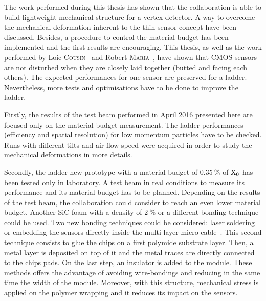 
The work performed during this thesis has shown that the collaboration is able to build lightweight mechanical structure for a vertex detector.
A way to overcome the mechanical deformation inherent to the thin-sensor concept have been discussed.
Besides, a procedure to control the material budget has been implemented and the first results are encouraging.
This thesis, as well as the work performed by Loic \textsc{Cousin}~\cite{cousin} and Robert \textsc{Maria}~\cite{maria}, have shown that \gls{CMOS} sensors are not disturbed when they are closely laid together (butted and facing each others).
The expected performances for one sensor are preserved for a ladder.
Nevertheless, more tests and optimisations have to be done to improve the ladder.

Firstly, the results of the test beam performed in April 2016 presented here are focused only on the material budget measurement.
The ladder performances (efficiency and spatial resolution) for low momentum particles have to be checked.
Runs with different tilts and air flow speed were acquired in order to study the mechanical deformations in more details.

Secondly, the ladder new prototype with a material budget of $0.35~\%$ of $\rm{X_{0}}$ has been tested only in laboratory.
A test beam in real conditions to measure its performance and its material budget has to be planned.
Depending on the results of the test beam, the collaboration could consider to reach an even lower material budget.
Another \gls{SiC} foam with a density of $2~\%$ or a different bonding technique could be used.
Two new bonding  techniques could be considered: laser soldering or embedding the sensors directly inside the multi-layer micro-cable~\cite{Baudot2012}.
This second technique consists to glue the chips on a first polymide substrate layer.
Then, a metal layer is deposited on top of it and the metal traces are directly connected to the chips pads.
On the last step, an insulator is added to the module.
These methods offers the advantage of avoiding wire-bondings and reducing in the same time the width of the module.
Moreover, with this structure, mechanical stress is applied on the polymer wrapping and it reduces its impact on the sensors.

